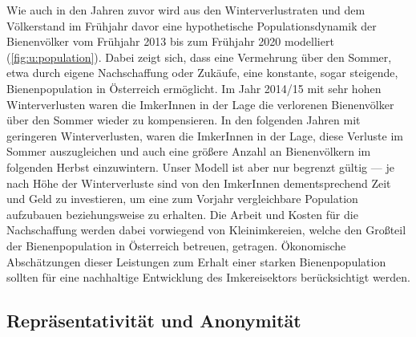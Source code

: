 Wie auch in den Jahren zuvor wird aus den Winterverlustraten und dem Völkerstand im Frühjahr davor eine hypothetische Populationsdynamik der Bienenvölker vom Frühjahr 2013 bis zum Frühjahr 2020 modelliert (\cref{fig:u:population}). Dabei zeigt sich, dass eine Vermehrung über den Sommer, etwa durch eigene Nachschaffung oder Zukäufe, eine konstante, sogar steigende, Bienenpopulation in Österreich ermöglicht.
\newline
Im Jahr 2014/15 mit sehr hohen Winterverlusten waren die ImkerInnen in der Lage die verlorenen Bienenvölker über den Sommer wieder zu kompensieren. In den folgenden Jahren mit geringeren Winterverlusten, waren die ImkerInnen in der Lage, diese Verluste im Sommer auszugleichen und auch eine größere Anzahl an Bienenvölkern im folgenden Herbst einzuwintern.
\newline
Unser Modell ist aber nur begrenzt gültig --- je nach Höhe der Winterverluste sind von den ImkerInnen dementsprechend Zeit und Geld zu investieren, um eine zum Vorjahr vergleichbare Population  aufzubauen beziehungsweise zu erhalten. Die Arbeit und Kosten für die Nachschaffung werden dabei vorwiegend von Kleinimkereien, welche den Großteil der Bienenpopulation in Österreich betreuen, getragen. Ökonomische Abschätzungen dieser Leistungen zum Erhalt einer starken Bienenpopulation sollten für eine nachhaltige Entwicklung des Imkereisektors berücksichtigt werden.

\subsection{Repräsentativität und Anonymität}


